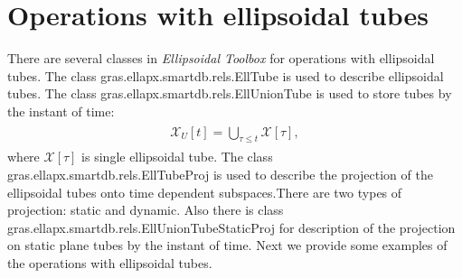 \documentclass[letterpaper,10pt,english]{sphinxmanual}
\begin{document}
\section{Operations with ellipsoidal tubes}
\label{chap_implement:section-label}\label{chap_implement:operations-with-ellipsoidal-tubes}
There are several classes in \emph{Ellipsoidal Toolbox} for operations with
ellipsoidal tubes. The class gras.ellapx.smartdb.rels.EllTube is used to
describe ellipsoidal tubes. The class
gras.ellapx.smartdb.rels.EllUnionTube is used to store tubes by the
instant of time:
\label{chap_implement:union-label}\label{chap_implement:equation-ellUnion}\begin{gather}
\begin{split}{\mathcal X}_{U}[t]=\bigcup \limits_{\tau\leqslant t}{\mathcal X}[\tau],\end{split}\label{chap_implement-ellUnion}
\end{gather}
where \({\mathcal X}[\tau]\) is single ellipsoidal tube. The class
gras.ellapx.smartdb.rels.EllTubeProj is used to describe the projection
of the ellipsoidal tubes onto time dependent subspaces.There are two
types of projection: static and dynamic. Also there is class
gras.ellapx.smartdb.rels.EllUnionTubeStaticProj for description of the
projection on static plane tubes by the instant of time. Next we provide
some examples of the operations with ellipsoidal tubes.
\end{document}
